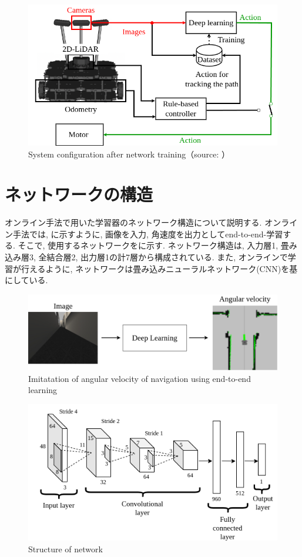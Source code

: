 \begin{figure}[h]
  \centering
  \includegraphics[keepaspectratio, scale=0.45]{images/si2021-okada-test.png}
  \caption{System configuration after network training（source: \cite{offline}）}
  \label{Fig:test}
  \end{figure}

  \newpage
\section{ネットワークの構造}
オンライン手法で用いた学習器のネットワーク構造について説明する. オンライン手法では, に示すように, 画像を入力, 角速度を出力としてend-to-end-学習する. そこで, 使用するネットワークをに示す. ネットワーク構造は, 入力層1, 畳み込み層3, 全結合層2, 出力層1の計7層から構成されている. また, オンラインで学習が行えるように, ネットワークは畳み込みニューラルネットワーク(CNN)を基にしている. 

\vspace{10mm}
\begin{figure}[h]
  \centering
  \includegraphics[keepaspectratio, scale=0.3]{images/end-to-end_net.png}
  \caption{Imitatation of angular velocity of navigation using end-to-end learning}
  \label{Fig:end-end_cnn}
  \end{figure}

\begin{figure}[h]
  \centering
  \includegraphics[keepaspectratio, scale=0.6]{images/cnn.png}
  \caption{Structure of network}
  \label{Fig:cnn}
  \end{figure}


